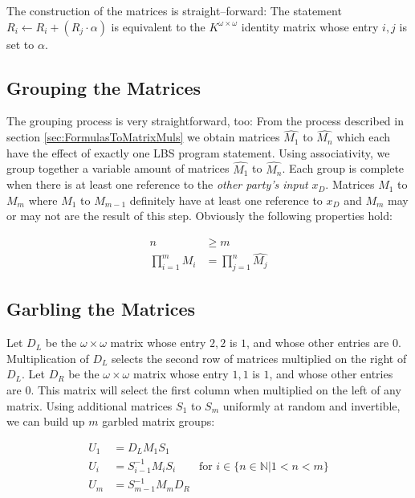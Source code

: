 \documentclass[12pt, a4paper]{article}
\begin{document}
\noindent{}The construction of the matrices is straight--forward: The statement
$R_i \leftarrow R_i + (R_j \cdot \alpha)$ is equivalent to the $K^{\omega \times
\omega}$ identity matrix whose entry $i,j$ is set to $\alpha$.


\subsection{Grouping the Matrices}
\label{sec:matrix-grouping}

The grouping process is very straightforward, too: From the process described in
section \ref{sec:FormulasToMatrixMuls} we obtain matrices $\widehat{M_1}$ to
$\widehat{M_n}$ which each have the effect of exactly one LBS program statement.
Using associativity, we group together a variable amount of matrices
$\widehat{M_1}$ to $\widehat{M_n}$. Each group is complete when there is at least
one reference to the \emph{other party's input} $x_D$.  Matrices $M_1$ to $M_m$
where $M_1$ to $M_{m-1}$ definitely have at least one reference to $x_D$ and
$M_m$ may or may not are the result of this step.  Obviously the following
properties hold:

\begin{align*}
n & \geq m \\
\prod_{i=1}^m M_i & = \prod_{j=1}^n \widehat{M_j}
\end{align*}

\subsection{Garbling the Matrices}
\label{sec:matrix-garbling}

Let $D_L$ be the $\omega \times \omega$ matrix whose entry $2,2$ is $1$, and
whose other entries are $0$. Multiplication of $D_L$ selects the second row of
matrices multiplied on the right of $D_L$. Let $D_R$ be the $\omega \times
\omega$ matrix whose entry $1,1$ is $1$, and whose other entries are $0$. This
matrix will select the first column when multiplied on the left of any matrix.
Using additional matrices $S_1$ to $S_{m}$ uniformly at random and invertible,
we can build up $m$ garbled matrix groups:

\begin{align*}
U_1 & = D_L M_1 S_1 \\
U_i & = S_{i-1}^{-1} M_i S_i &
\text{for $i \in \{n \in \mathbb{N} \big| 1 < n < m\}$}\\
U_m & = S_{m-1}^{-1} M_m D_R
\end{align*}
\end{document}
